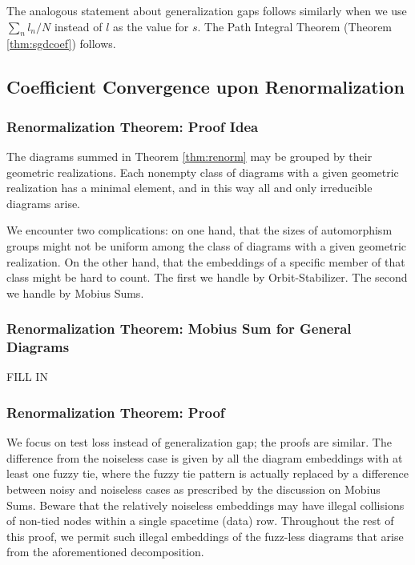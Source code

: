 \documentclass{article}
\begin{document}
            The analogous statement about generalization gaps follows similarly
            when we use $\sum_n l_n/N$ instead of $l$ as the value for $s$. 
            The Path Integral Theorem (Theorem \ref{thm:sgdcoef}) follows.

    \subsection{Coefficient Convergence upon Renormalization}
        \subsubsection*{Renormalization Theorem: Proof Idea}
            The diagrams summed in Theorem \ref{thm:renorm} may be grouped by
            their geometric realizations.  Each nonempty class of diagrams with
            a given geometric realization has a minimal element, and in this
            way all and only irreducible diagrams arise. 

            We encounter two complications: on one hand, that the sizes of
            automorphism groups might not be uniform among the class of
            diagrams with a given geometric realization.  On the other hand,
            that the embeddings of a specific member of that class might be
            hard to count.  The first we handle by Orbit-Stabilizer.  The
            second we handle by Mobius Sums.

        \subsubsection*{Renormalization Theorem: Mobius Sum for General Diagrams}
            {\color{moor} FILL IN}
            
        \subsubsection*{Renormalization Theorem: Proof}
            We focus on test loss instead of generalization gap; the proofs are
            similar. The
            difference from the noiseless case is given by all the diagram
            embeddings with at least one fuzzy tie, where the fuzzy tie pattern
            is actually replaced by a difference between noisy and noiseless
            cases as prescribed by the discussion on Mobius Sums.
            Beware that the relatively noiseless embeddings may have illegal
            collisions of non-tied nodes within a single spacetime (data) row.
            Throughout the rest of this proof, we permit such illegal
            embeddings of the fuzz-less diagrams that arise from the
            aforementioned decomposition.  
\end{document}
